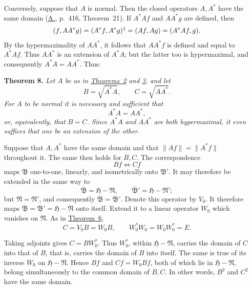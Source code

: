 \documentclass[fontsize=13pt,paper=b5,leqno,bookmarkpackage=false]{scrartcl}
\begin{document}
Conversely, suppose that \(A\) is normal.  Then the closed operators
\(A,A^*\) have the same domain (\hyperlink{bib:A}{A.}, p.~416,
Theorem~21).  If \(A^*Af\) and \(AA^*g\) are defined, then
\[
  (f,AA^*g)
  =(A^*f,A^*g)\footnotemark
  =(Af,Ag)
  =(A^*Af,g).
\]
By the hypermaximality of \(AA^*\), it follows that \(AA^*f\) is defined
and equal to \(A^*Af\).  Thus \(AA^*\) is an extension of \(A^*A\); but
the latter too is hypermaximal, and consequently
\(A^*A=AA^*\).  Thus:

\par\smallskip
{}
\label{thm:8}
\noindent\textbf{Theorem 8.}
\textit{Let \(A\) be as in \hyperref[thm:2]{Theorems~2} and
\hyperref[thm:3]{3}, and let}
\[
  B=\sqrt{A^*A},
  \qquad
  C=\sqrt{AA^*}.
\]
\textit{For \(A\) to be normal it is necessary and sufficient that}
\[
  A^*A=AA^*,
\]
\textit{or, equivalently, that \(B=C\).  Since \(A^*A\) and \(AA^*\) are
both hypermaximal, it even suffices that one be an extension of the
other.}


Suppose that \(A,A^*\) have the same domain and that
\(\lVert Af\rVert=\lVert A^*f\rVert\) throughout it.  The same then holds
for \(B,C\).  The correspondence
\[
  Bf\Longleftrightarrow Cf
\]
maps \(\mathfrak B\) one-to-one, linearly, and isometrically onto
\(\mathfrak B'\).  It may therefore be extended in the same way to
\[
  \overline{\mathfrak B}=\mathfrak H-\mathfrak N,
  \qquad
  \overline{\mathfrak B}'=\mathfrak H-\mathfrak N';
\]
but \(\mathfrak N=\mathfrak N'\), and consequently
\(\overline{\mathfrak B}=\overline{\mathfrak B}'\).  Denote this operator
by \(V_0\).  It therefore maps
\(\overline{\mathfrak B}=\overline{\mathfrak B}'
=\mathfrak H-\mathfrak N\) onto itself.  Extend it to a linear operator
\(W_0\) which vanishes on \(\mathfrak N\).  As in
\hyperref[thm:6]{Theorem~6},
\[
  C=V_0B=W_0B,
  \qquad
  W_0^*W_0=W_0W_0^*=E.
\]

Taking adjoints gives \(C=BW_0^*\).  Thus \(W_0^*\), within
\(\mathfrak H-\mathfrak N\), carries the domain of \(C\) into that of
\(B\), that is, carries the domain of \(B\) into itself.  The same is true
of its inverse \(W_0\) on \(\mathfrak H-\mathfrak N\).  Hence \(Bf\) and
\(Cf=W_0Bf\), both of which lie in \(\mathfrak H-\mathfrak N\), belong
simultaneously to the common domain of \(B,C\).  In other words, \(B^2\)
and \(C^2\) have the same domain.
\end{document}
